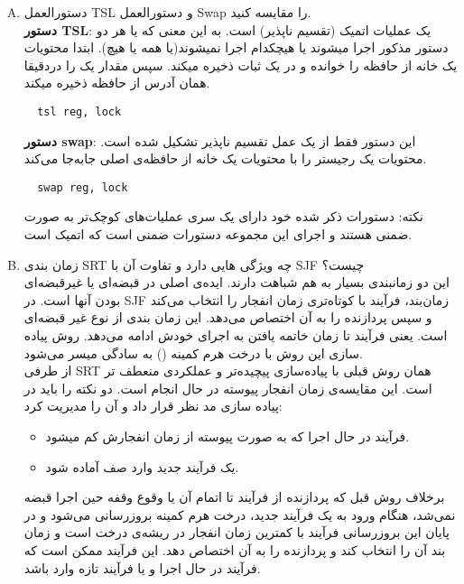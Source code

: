 \documentclass[]{article}
\begin{document}
\begin{enumerate}[(A)]
      \item  دستورالعمل TSL و دستورالعمل Swap را مقایسه کنید.
            \\ \textbf{دستور TSL}:
            یک عملیات اتمیک (تقسیم ناپذیر) است.
            به این معنی که یا هر دو دستور مذکور اجرا میشوند یا هیچکدام اجرا
            نمیشوند(یا همه یا هیچ). ابتدا محتویات یک خانه از حافظه را خوانده و در یک ثبات ذخیره میکند. سپس مقدار یک را دردقیقا همان آدرس از حافظه ذخیره میکند.
            \begin{latin}
                  \begin{lstlisting}
  tsl reg, lock
\end{lstlisting}
            \end{latin}
            \textbf{دستور swap}:
            این دستور فقط از یک عمل تقسیم ناپذیر تشکیل شده است.
            محتویات یک رجیستر را با محتویات یک خانه از حافظه‌ی اصلی جابه‌جا می‌کند.
            \begin{latin}
                  \begin{lstlisting}
  swap reg, lock
\end{lstlisting}
            \end{latin}
            نکته: دستورات ذکر شده خود دارای یک سری عملیات‌های کوچک‌تر به صورت ضمنی هستند و
            اجرای این مجموعه دستورات ضمنی است که اتمیک است.
            \pagebreak
      \item  زمان بندی SRT چه ویژگی هایی دارد و تفاوت آن با SJF چیست؟
            \\ این دو زمانبندی بسیار به هم شباهت دارند.
            ایده‌ی اصلی در قبضه‌ای یا غیرقبضه‌ای بودن آنها است.
            در SJF زمان‌بند، فرآیند با کوتاه‌تری زمان انفجار را انتخاب می‌کند
            و سپس پردازنده را به آن اختصاص می‌دهد.
            این زمان بندی از نوع غیر قبضه‌ای است.
            یعنی فرآیند تا زمان خاتمه یافتن به اجرای خودش ادامه می‌دهد.
            روش پیاده سازی این روش با درخت هرم کمینه () به سادگی میسر می‌شود.
            \\
            از طرفی SRT همان روش قبلی با پیاده‌سازی پیچیده‌تر و عملکردی منعطف تر است.
            این مقایسه‌ی زمان انفجار پیوسته در حال انجام است.
            دو نکته را باید در پیاده سازی مد نظر قرار داد و آن را مدیریت کرد:
            \begin{itemize}
                  \item فرآیند در حال اجرا که به صورت پیوسته از زمان انفجارش کم میشود.
                  \item یک فرآیند جدید وارد صف آماده شود.
            \end{itemize}
            برخلاف روش قبل که پردازنده از فرآیند تا اتمام آن یا وقوع وقفه حین اجرا قبضه نمی‌شد،
            هنگام ورود به یک فرآیند جدید، درخت هرم کمینه بروزرسانی می‌شود و در پایان این بروزرسانی فرآیند با کمترین زمان انفجار
            در ریشه‌ی درخت است و زمان بند آن را انتخاب کند و پردازنده را به آن اختصاص دهد.
            این فرآیند ممکن است که فرآیند در حال اجرا و یا فرآیند تازه وارد باشد.
\end{enumerate}
\end{document}
